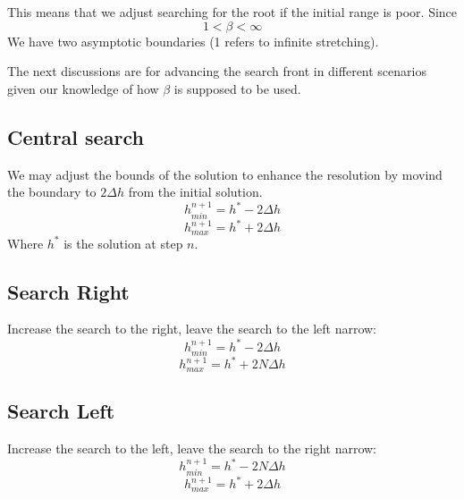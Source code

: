 \documentclass[11pt]{article}
\begin{document}
This means that we adjust searching for the root if the initial range is poor.
Since
\begin{equation}
	1 < \beta < \infty
\end{equation}
We have two asymptotic boundaries (1 refers to infinite stretching).

The next discussions are for advancing the search front in different scenarios given our knowledge of how $\beta$ is supposed to be used.

\subsection{Central search}
We may adjust the bounds of the solution to enhance the resolution by movind the boundary to $2 \Delta h$ from the initial solution.
\begin{equation}
	h_{min}^{n+1} = h^* - 2\Delta h
\end{equation}
\begin{equation}
	h_{max}^{n+1} = h^* + 2\Delta h
\end{equation}
Where $h^*$ is the solution at step $n$.

\subsection{Search Right}
Increase the search to the right, leave the search to the left narrow:
\begin{equation}
	h_{min}^{n+1} = h^* - 2\Delta h
\end{equation}
\begin{equation}
	h_{max}^{n+1} = h^* + 2N\Delta h
\end{equation}

\subsection{Search Left}
Increase the search to the left, leave the search to the right narrow:
\begin{equation}
	h_{min}^{n+1} = h^* - 2N\Delta h
\end{equation}
\begin{equation}
	h_{max}^{n+1} = h^* + 2\Delta h
\end{equation}
\end{document}
